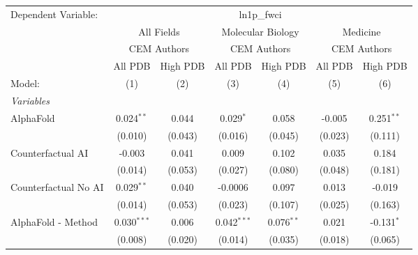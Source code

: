 \begingroup
\centering
\begin{tabular}{lcccccc}
   \tabularnewline \midrule \midrule
   Dependent Variable: & \multicolumn{6}{c}{ln1p\_fwci}\\
 & \multicolumn{2}{c}{All Fields} & \multicolumn{2}{c}{Molecular Biology} & \multicolumn{2}{c}{Medicine} \\
\cmidrule(lr){2-3} \cmidrule(lr){4-5} \cmidrule(lr){6-7}
 & \multicolumn{2}{c}{CEM Authors} & \multicolumn{2}{c}{CEM Authors} & \multicolumn{2}{c}{CEM Authors} \\
\cmidrule(lr){2-3} \cmidrule(lr){4-5} \cmidrule(lr){6-7}
 & \multicolumn{1}{c}{All PDB} & \multicolumn{1}{c}{High PDB} & \multicolumn{1}{c}{All PDB} & \multicolumn{1}{c}{High PDB} & \multicolumn{1}{c}{All PDB} & \multicolumn{1}{c}{High PDB} \\
\cmidrule(lr){2-2} \cmidrule(lr){3-3} \cmidrule(lr){4-4} \cmidrule(lr){5-5} \cmidrule(lr){6-6} \cmidrule(lr){7-7}
   Model:                                                     & (1)           & (2)     & (3)           & (4)          & (5)     & (6)\\  
   \midrule
   \emph{Variables}\\
   AlphaFold                                                  & 0.024$^{**}$  & 0.044   & 0.029$^{*}$   & 0.058        & -0.005  & 0.251$^{**}$\\   
                                                              & (0.010)       & (0.043) & (0.016)       & (0.045)      & (0.023) & (0.111)\\   
   Counterfactual AI                                          & -0.003        & 0.041   & 0.009         & 0.102        & 0.035   & 0.184\\   
                                                              & (0.014)       & (0.053) & (0.027)       & (0.080)      & (0.048) & (0.181)\\   
   Counterfactual No AI                                       & 0.029$^{**}$  & 0.040   & -0.0006       & 0.097        & 0.013   & -0.019\\   
                                                              & (0.014)       & (0.053) & (0.023)       & (0.107)      & (0.025) & (0.163)\\   
   AlphaFold - Method                                         & 0.030$^{***}$ & 0.006   & 0.042$^{***}$ & 0.076$^{**}$ & 0.021   & -0.131$^{*}$\\   
                                                              & (0.008)       & (0.020) & (0.014)       & (0.035)      & (0.018) & (0.065)\\   

\end{tabular}

